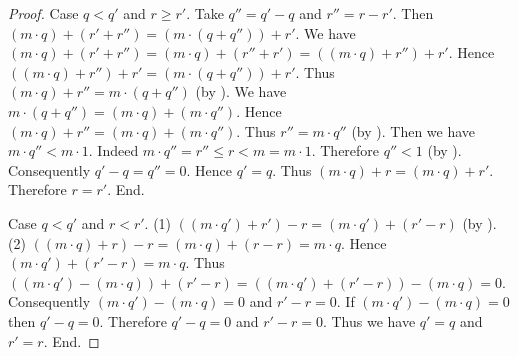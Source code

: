 \documentclass{article}
\begin{document}
\begin{forthel}
\begin{proof}
      Case $q < q'$ and $r \geq r'$.
        Take $q'' = q' - q$ and $r'' = r - r'$.
        Then $(m \cdot q) + (r' + r'') = (m \cdot (q + q'')) + r'$.
        We have $(m \cdot q) + (r' + r'')
          = (m \cdot q) + (r'' + r')
          = ((m \cdot q) + r'') + r'$.
        Hence $((m \cdot q) + r'') + r' = (m \cdot (q + q'')) + r'$.
        Thus $(m \cdot q) + r'' = m \cdot (q + q'')$ (by ).
        We have $m \cdot (q + q'') = (m \cdot q) + (m \cdot q'')$.
        Hence $(m \cdot q) + r'' = (m \cdot q) + (m \cdot q'')$.
        Thus $r'' = m \cdot q''$ (by ).
        Then we have $m \cdot q'' < m \cdot 1$.
        Indeed $m \cdot q''
          = r''
          \leq r
          < m
          = m \cdot 1$.
        Therefore $q'' < 1$ (by ).
        Consequently $q' - q = q'' = 0$.
        Hence $q' = q$.
        Thus $(m \cdot q) + r = (m \cdot q) + r'$.
        Therefore $r = r'$.
      End.

      Case $q < q'$ and $r < r'$.
        (1) $((m \cdot q') + r') - r = (m \cdot q') + (r' - r)$ (by ).
        (2) $((m \cdot q) + r) - r
          = (m \cdot q) + (r - r)
          = m \cdot q$.
        Hence $(m \cdot q') + (r' - r) = m \cdot q$.
        Thus $((m \cdot q') - (m \cdot q)) + (r' - r)
          = ((m \cdot q') + (r' - r)) - (m \cdot q)
          = 0$.
        Consequently $(m \cdot q') - (m \cdot q) = 0$ and $r' - r = 0$.
        If $(m \cdot q') - (m \cdot q) = 0$ then $q' - q = 0$.
        Therefore $q' - q = 0$ and $r' - r = 0$.
        Thus we have $q' = q$ and $r' = r$.
      End.
    \end{proof}
  \end{forthel}

  \printbibliography
\end{document}

